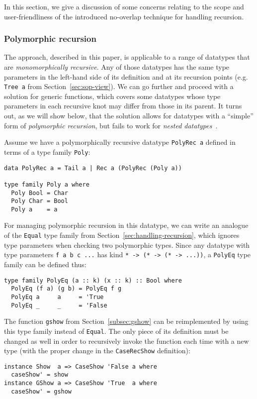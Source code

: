 \documentclass[runningheads]{llncs}
\newcommand{\K}[1]{\lstinline[style=fancy]{#1}}
\begin{document}
In this section, we give a discussion of some concerns relating to the scope and user-friendliness of the introduced no-overlap technique for handling recursion.

\subsubsection{Polymorphic recursion}

The approach, described in this paper, is applicable to a range of datatypes that are \emph{monomorphically recursive}. Any of those datatypes has the same type parameters in the left-hand side of its definition and at its recursion points (e.g. \K{Tree a} from Section~\ref{sec:sop-view}). We can go further and proceed with a solution for generic functions, which covers some datatypes whose type parameters in each recursive knot may differ from those in its parent. It turns out, as we will show below, that the solution allows for datatypes with a ``simple'' form of \emph{polymorphic recursion}, but fails to work for \emph{nested datatypes}~\cite{Bird1998}.

Assume we have a polymorphically recursive datatype \K{PolyRec a} defined in terms of a type family \K{Poly}:
\begin{lstlisting}[style=fancy]
data PolyRec a = Tail a | Rec a (PolyRec (Poly a))

type family Poly a where
  Poly Bool = Char
  Poly Char = Bool
  Poly a    = a
\end{lstlisting}

For managing polymorphic recursion in this datatype, we can write an analogue of the \K{Equal} type family from Section~\ref{sec:handling-recursion}, which ignores type parameters when checking two polymorphic types. Since any datatype with type parameters \K{f a b c ...} has kind \K{* -> (* -> (* -> ...))}, a \K{PolyEq} type family can be defined thus:
\begin{lstlisting}[style=fancy]
type family PolyEq (a :: k) (x :: k) :: Bool where
  PolyEq (f a) (g b) = PolyEq f g
  PolyEq a     a     = 'True
  PolyEq _     _     = 'False
\end{lstlisting}

The function \K{gshow} from Section~\ref{subsec:gshow} can be reimplemented by using this type family instead of \K{Equal}. The only piece of its definition must be changed as well in order to recursively invoke the function each time with a new type (with the proper change in the \K{CaseRecShow} definition):
\begin{lstlisting}[style=fancy]
instance Show  a => CaseShow 'False a where
  caseShow' = show
instance GShow a => CaseShow 'True  a where
  caseShow' = gshow
\end{lstlisting}
\end{document}
